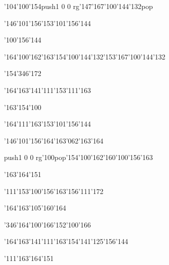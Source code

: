 \null\vfill\ipa\centerline{\enskip\enskip\enskip\enskip\char'104\char'100\char'154\enskip\pdfcolorstack\match push{1 0 0 rg}\char'147\char'167\char'100\char'144\char'132\pdfcolorstack\match pop{}}\medskip\centerline{\enskip\enskip\enskip\char'146\char'101\char'156\enskip\char'153\char'101\char'156\char'144\enskip\enskip\enskip}\medskip\centerline{\enskip\enskip\enskip\enskip\enskip\enskip\enskip\enskip\enskip\enskip\enskip\enskip}\medskip\centerline{\enskip\enskip\enskip\enskip\char'100\char'156\char'144\enskip\enskip\enskip\enskip\enskip\enskip\enskip}\medskip\centerline{\enskip\char'164\char'100\char'162\enskip\char'163\char'154\char'100\char'144\char'132\enskip\char'153\char'167\char'100\char'144\char'132\enskip\enskip\enskip}\medskip\centerline{\enskip\enskip\enskip\enskip\enskip\enskip\enskip\enskip\enskip\enskip\enskip\char'154\char'346\char'172\enskip\enskip\enskip}\medskip\centerline{\enskip\char'164\char'163\char'141\char'111\char'153\enskip\enskip\enskip\enskip\enskip\enskip\enskip\enskip\enskip\enskip\char'111\char'163}\medskip\centerline{\enskip\enskip\enskip\char'163\char'154\char'100\enskip\enskip\enskip\enskip\enskip\enskip}\medskip\centerline{\enskip\enskip\enskip\enskip\enskip\enskip\enskip\char'164\char'111\char'163\enskip\char'153\char'101\char'156\char'144}\medskip\vfill\footline{\hfil\tt\folio\hfil}\eject
\null\vfill\ipa\centerline{\enskip\enskip\enskip\enskip\char'146\char'101\char'156\enskip\char'164\char'163\char'062\char'163\char'164}\medskip\centerline{\enskip\pdfcolorstack\match push{1 0 0 rg}\char'100\pdfcolorstack\match pop{}\enskip\char'154\char'100\char'162\enskip\char'160\char'100\char'156\char'163\enskip\enskip\enskip}\medskip\centerline{\enskip\enskip\enskip\char'163\char'164\char'151\enskip\enskip\enskip\enskip\enskip\enskip}\medskip\centerline{\enskip\char'111\char'153\enskip\char'100\char'156\char'163\enskip\enskip\enskip\enskip\char'156\char'111\char'172}\medskip\centerline{\enskip\enskip\enskip\enskip\enskip\char'164\char'163\char'105\char'160\char'164\enskip\enskip\enskip\enskip\enskip\enskip\enskip\enskip\enskip}\medskip\centerline{\enskip\char'346\enskip\enskip\enskip\enskip\enskip\char'164\char'100\char'166\enskip\char'152\char'100\char'166\enskip\enskip\enskip}\medskip\centerline{\enskip\char'164\char'163\char'141\char'111\char'163\enskip\enskip\enskip\enskip\char'154\char'141\char'125\char'156\char'144\enskip\enskip\enskip}\medskip\centerline{\enskip\char'111\enskip\char'163\char'164\char'151\enskip\enskip\enskip\enskip\enskip\enskip}\medskip\centerline{\enskip\enskip\enskip\enskip\enskip\enskip\enskip\enskip\enskip\enskip\enskip\enskip\enskip\enskip\enskip}\medskip\vfill\footline{\hfil\tt\folio\hfil}\eject
